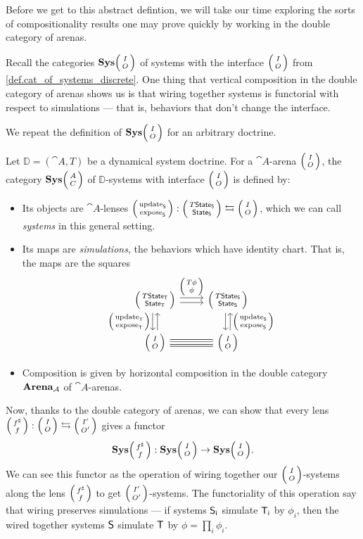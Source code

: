 \documentclass[DynamicalBook]{subfiles}
\begin{document}
Before we get to this abstract defintion, we will take our time exploring the
sorts of compositionality results one may prove quickly by working in the double
category of arenas.

Recall the categories $\Cat{Sys}\lens{I}{O}$ of systems with the interface
$\lens{I}{O}$ from
\cref{def.cat_of_systems_discrete}. One thing that vertical composition in the
double category of arenas shows us is that wiring together systems is functorial
with respect to simulations --- that is, behaviors that don't change the
interface.

We repeat the definition of $\Cat{Sys}\lens{I}{O}$ for an arbitrary doctrine.
  \begin{definition}\label{def.cat_of_systems}
  Let $\mathbb{D} = (\cat{A}, T)$ be a dynamical system doctrine. For a
    $\cat{A}$-arena $\lens{I}{O}$, the category $\Cat{Sys}\lens{A}{C}$ of
    $\mathbb{D}$-systems with interface $\lens{I}{O}$ is defined by:
\begin{itemize}
  \item Its objects are $\cat{A}$-lenses $\lens{\update{S}}{\expose{S}} :
    \lens{T\State{S}}{\State{S}} \fromto \lens{I}{O}$, which we can call
    \emph{systems} in this general setting.
  \item Its maps are \emph{simulations}, the behaviors which have identity
    chart. That is, the maps are the squares 
\[
    \begin{tikzcd}
      \lens{T\State{T}}{\State{T}} \ar[r, shift left, "\lens{T\phi}{\phi}"] \ar[r, shift right] \ar[d, shift right,
      "\lens{\update{T}}{\expose{T}}"'] \ar[d, shift left, leftarrow] &
      \lens{T\State{S}}{\State{S}} \ar[d, shift left, leftarrow,
      "\lens{\update{S}}{\expose{S}}"] \ar[d, shift right]\\
      \lens{I}{O} \ar[r, shift right, equals] \ar[r,
      shift left, equals] & \lens{I}{O}
    \end{tikzcd}
\]
\item Composition is given by horizontal composition in the double category
  $\textbf{Arena}_{\mathcal{A}}$ of $\cat{A}$-arenas.
\end{itemize}
  \end{definition}

Now, thanks to the double category of arenas, we can show that every lens
$\lens{f^{\sharp}}{f} : \lens{I}{O} \fromto \lens{I'}{O'}$ gives a functor 
  $$\Cat{Sys}\lens{f^\sharp}{f} : \Cat{Sys}\lens{I}{O} \to
  \Cat{Sys}\lens{I}{O}.$$
We can see this functor as the operation of wiring together our
$\lens{I}{O}$-systems along the lens $\lens{f^{\sharp}}{f}$ to get
$\lens{I'}{O'}$-systems. The functoriality of this operation say that wiring
preserves simulations --- if systems $\mathsf{S_i}$ simulate $\mathsf{T_i}$ by $\phi_i$,
then the wired together systems $\mathsf{S}$ simulate $\mathsf{T}$ by $\phi = \prod_i
\phi_i$. 
\end{document}
